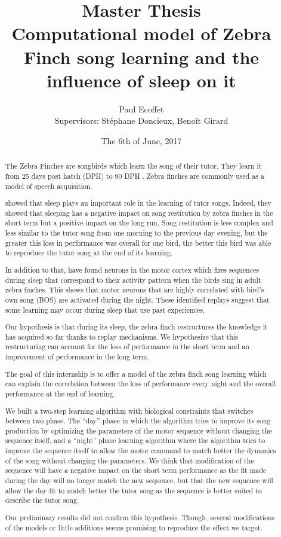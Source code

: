 \documentclass{report}
\title{Master Thesis\\ Computational model of Zebra Finch song learning and the
influence of sleep on it}
\author{Paul Ecoffet\\
Supervisors: Stéphane Doncieux, Benoît Girard}
\date{The 6th of June, 2017}
\begin{document}
\maketitle

\begin{abstract}
The Zebra Finches are songbirds which learn the song of their tutor. They learn
it from 25 days post hatch (DPH) to 90 DPH \parencite{liu_juvenile_2004}. Zebra
finches are commonly used as a model of speech acquisition.

\textcite{deregnaucourt_how_2005} showed that sleep plays an important role in
the learning of tutor songs. Indeed, they showed that sleeping has a negative
impact on song restitution by zebra finches in the short term but a positive
impact on the long run. Song restitution is less complex and less similar to the
tutor song from one morning to the previous day evening, but the greater this
loss in performance was overall for one bird, the better this bird was able to
reproduce the tutor song at the end of its learning.

In addition to that, \textcite{dave_song_2000} have found neurons in the motor
cortex which fires sequences during sleep that correspond to their activity
pattern when the birds sing in adult zebra finches. This shows that motor
neurons that are highly correlated with bird's own song (BOS) are activated
during the night. These identified replays suggest that some learning may occur
during sleep that use past experiences.

Our hypothesis is that during its sleep, the zebra finch restructures the
knowledge it has acquired so far thanks to replay mechanisms. We hypothesize
that this restructuring can account for the loss of performance in the short
term and an improvement of performance in the long term.

The goal of this internship is to offer a model of the zebra finch song learning
which can explain the correlation between the loss of performance every night
and the overall performance at the end of learning.

We built a two-step learning algorithm with biological constraints that switches
between two phase. The ``day'' phase in which the algorithm tries to improve its
song production by optimizing the parameters of the motor sequence without
changing the sequence itself, and a ``night'' phase learning algorithm where the
algorithm tries to improve the sequence itself to allow the motor command to
match better the dynamics of the song without changing the parameters. We think
that modification of the sequence will have a negative impact on the short term
performance as the fit made during the day will no longer match the new
sequence, but that the new sequence will allow the day fit to match better the
tutor song as the sequence is better suited to describe the tutor song.

Our preliminary results did not confirm this hypothesis. Though, several
modifications of the models or little additions seems promising to reproduce the
effect we target.

\end{abstract}
\end{document}
